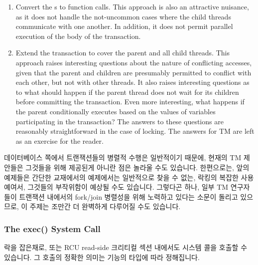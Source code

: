 \begin{enumerate}
\item	Convert the s to function calls.
	This approach is also an attractive nuisance, as it does not
	handle the not-uncommon cases where the child threads communicate
	with one another.
	In addition, it does not permit parallel execution of the body
	of the transaction.
\item	Extend the transaction to cover the parent and all child threads.
	This approach raises interesting questions about the nature of
	conflicting accesses, given that the parent and children are
	presumably permitted to conflict with each other, but not with
	other threads.
	It also raises interesting questions as to what should happen
	if the parent thread does not wait for its children before
	committing the transaction.
	Even more interesting, what happens if the parent conditionally
	executes  based on the values of variables
	participating in the transaction?
	The answers to these questions are reasonably straightforward
	in the case of locking.
	The answers for TM are left as an exercise for the reader.
\fi
\end{enumerate}

데이터베이스 쪽에서 트랜잭션들의 병렬적 수행은 일반적이기 때문에, 현재의 TM
제안들은 그것들을 위해 제공된게 아니란 점은 놀라울 수도 있습니다.
한편으로는, 앞의 예제들은 간단한 교재에서의 예제에서는 일반적으로 찾을 수 없는,
락킹의 복잡한 사용 예여서, 그것들의 부작위함이 예상될 수도 있습니다.
그렇다곤 하나, 일부 TM 연구자들이 트랜잭션 내에서의 fork/join 병렬성을 위해
노력하고 있다는 소문이 돌리고 있으므로, 이 주제는 조만간 더 완벽하게 다루어질
수도 있습니다.

\subsubsection{The exec() System Call}
\label{sec:future:The exec System Call}

락을 잡은채로, 또는 RCU read-side 크리티컬 섹션 내에서도  시스템
콜을 호출할 수 있습니다.
그 호출의 정확한 의미는 기능의 타입에 따라 정해집니다.

